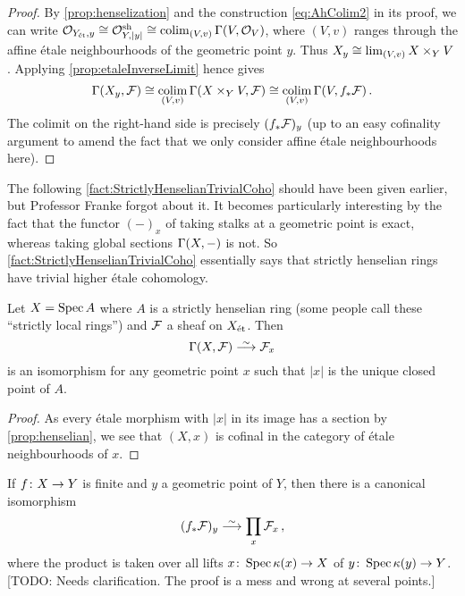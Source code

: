 \documentclass[a4paper, 10pt, oneside, DIV=9, chapterprefix=true, numbers=enddot, bibliography=totoc]{scrbook}
\begin{document}
\begin{proof}
	By \cref{prop:henselization} and the construction \cref{eq:AhColim2} in its proof, we can write $\mathcal{O}_{Y_{\mathrm{\acute{e}t}},y}\cong \mathcal{O}_{Y,|y|}^{\mathrm{sh}}\cong \operatorname*{colim}_{(V,v)}\operatorname{\Gamma}(V,\mathcal{O}_V)$, where $(V,v)$ ranges through the affine étale neighbourhoods of the geometric point $y$. Thus $X_y\cong \operatorname*{lim}_{(V,v)}X\times_YV$. Applying \cref{prop:etaleInverseLimit} hence gives
	\begin{equation*}
		\operatorname{\Gamma}(X_y,\mathcal{F})\cong \operatorname*{colim}_{(V,v)}\operatorname{\Gamma}(X\times_YV,\mathcal{F})\cong \operatorname*{colim}_{(V,v)}\operatorname{\Gamma}(V,f_*\mathcal{F})\,.
	\end{equation*}
	The colimit on the right-hand side is precisely $(f_*\mathcal{F})_y$ (up to an easy cofinality argument to amend the fact that we only consider affine étale neighbourhoods here).
\end{proof}
The following \cref{fact:StrictlyHenselianTrivialCoho} should have been given earlier, but Professor Franke forgot about it. It becomes particularly interesting by the fact that the functor $(-)_x$ of taking stalks at a geometric point is exact, whereas taking global sections $\operatorname{\Gamma}(X,-)$ is not. So \cref{fact:StrictlyHenselianTrivialCoho} essentially says that strictly henselian rings have trivial higher étale cohomology.
\begin{fact}\label{fact:StrictlyHenselianTrivialCoho}
	Let $X=\operatorname{Spec} A$ where $A$ is a strictly henselian ring (some people call these \enquote{strictly local rings}) and $\mathcal{F}$ a sheaf on $X_{\mathrm{\acute{e}t}}$. Then
	\begin{equation*}
		\Global(X,\Ff)\isomorphism \Ff_x
	\end{equation*}
	is an isomorphism for any geometric point $x$ such that $|x|$ is the unique closed point of $A$.
\end{fact}
\begin{proof}
	As every étale morphism with $|x|$ in its image has a section by \cref{prop:henselian}, we see that $(X,x)$ is cofinal in the category of étale neighbourhoods of $x$.
\end{proof}
\begin{cor}\label{cor:finiteStalks}
	If $f\colon X\morphism Y$ is finite and $y$ a geometric point of $Y$, then there is a canonical isomorphism
	\begin{equation*}
		(f_*\Ff)_y\isomorphism\prod_{x}\Ff_x\,,
	\end{equation*}
	where the product is taken over all lifts $x\colon \Spec \kappa(x)\morphism X$ of $y\colon \Spec\kappa(y)\morphism Y$. [TODO: Needs clarification. The proof is a mess and wrong at several points.]
\end{cor}
\end{document}

